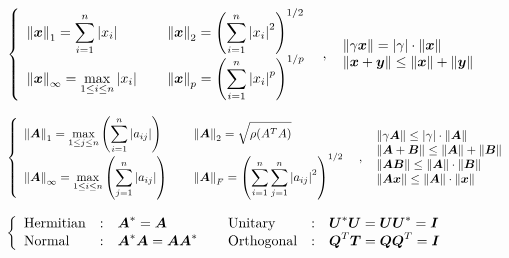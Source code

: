 \documentclass[12pt, leqno]{article}
\begin{document}
$
	\left\{
	\begin{array}{l \tsp l}
		\fVt{\fbs{x}}_1 = \dsp \sum_{i=1}^n\fvt{x_i} &
		\fVt{\fbs{x}}_2 = \dsp \fbt{\sum_{i=1}^n\fvt{x_i}^2}^{1/2} \\
		\fVt{\fbs{x}}_\infty = \dsp \max_{1 \leq i \leq n}\fvt{x_i} &
		\fVt{\fbs{x}}_p = \dsp \fbt{\sum_{i=1}^n\fvt{x_i}^p}^{1/p} \\
	\end{array}
	\right. \esp
	\begin{array}{l}
		\fVt{\gamma\fbs{x}}=\fvt{\gamma}\cdot\fVt{\fbs{x}} \\
		\fVt{\fbs{x}+\fbs{y}} \leq \fVt{\fbs{x}}+\fVt{\fbs{y}} \\
	\end{array}
$

$
	\left\{
	\begin{array}{l \tsp l}
		\fVt{\fbs{A}}_1 = \dsp \max_{1 \leq j \leq n}
		\fbt{\sum_{i=1}^n\fvt{a_{ij}}} &
		\fVt{\fbs{A}}_2 = \dsp \sqrt{\rho(A^TA)} \\
		\fVt{\fbs{A}}_\infty = \dsp \max_{1 \leq i \leq n}
		\fbt{\sum_{j=1}^n\fvt{a_{ij}}} &
		\fVt{\fbs{A}}_F = \dsp \fbt{\sum_{i=1}^n\sum_{j=1}^n
		\fvt{a_{ij}}^2}^{1/2} \\
	\end{array}
	\right. \esp
	\begin{array}{l}
		\fVt{\gamma\fbs{A}} \leq \fvt{\gamma} \cdot \fVt{\fbs{A}} \\
		\fVt{\fbs{A}+\fbs{B}} \leq \fVt{\fbs{A}} + \fVt{\fbs{B}} \\
		\fVt{\fbs{AB}} \leq \fVt{\fbs{A}} \cdot \fVt{\fbs{B}} \\
		\fVt{\fbs{Ax}} \leq \fVt{\fbs{A}} \cdot \fVt{\fbs{x}} \\
	\end{array}
$

$
	\left\{
	\begin{array}{lcl \tsp lcl}
		\text{Hermitian} & : & \fbs{A}^\ast = \fbs{A} &
		\text{Unitary} & : & \fbs{U}^\ast\fbs{U} = \fbs{U}\fbs{U}^\ast =
		\fbs{I} \\
		\text{Normal} & : & \fbs{A}^\ast\fbs{A} = \fbs{AA}^\ast &
		\text{Orthogonal} & : & \fbs{Q}^T\fbs{T} = \fbs{QQ}^T = \fbs{I}
	\end{array}
	\right.
$
\end{document}
